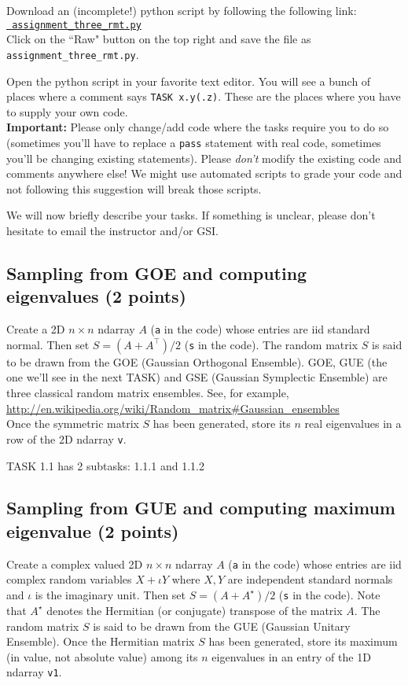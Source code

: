 \documentclass{article}
\begin{document}
Download an (incomplete!) python script by following the following
link:\\
\href{https://github.com/ambujtewari/stats607a-fall2017/blob/master/homeworks/assignment_three_rmt.py}{\tt
assignment\_three\_rmt.py} \\
Click on the ``Raw" button on the top right and save the file as {\tt
assignment\_three\_rmt.py}.

Open the python script in your favorite text editor. You will see a bunch of places where a comment says {\tt TASK x.y(.z)}. These are the places where you have to supply your
own code.\\
{\bf Important:} Please only change/add code where the tasks require you to do so (sometimes you'll have to replace a {\tt pass} statement with real code, sometimes you'll be changing existing statements). Please {\em don't} modify the existing code and comments anywhere else! We might use automated scripts to grade your code and not following this suggestion will break those scripts.

We will now briefly describe your tasks. If something is unclear, please don't hesitate to email the instructor and/or GSI.

\subsection{Sampling from GOE and computing eigenvalues (2 points)}

Create a 2D $n \times n$ ndarray $A$ (\verb#a# in the code) whose entries are iid standard normal. Then set $S = (A+A^\top)/2$ (\verb#s# in the code). The random matrix $S$ is said to be drawn from the GOE (Gaussian Orthogonal
Ensemble). GOE, GUE (the one we'll see in the next TASK) and GSE (Gaussian Symplectic Ensemble) are three classical random matrix ensembles. See, for example, \\
\url{http://en.wikipedia.org/wiki/Random_matrix#Gaussian_ensembles}\\
Once the symmetric matrix $S$ has been generated, store its $n$ real eigenvalues in a row of the 2D ndarray \verb#v#.

TASK 1.1 has 2 subtasks: 1.1.1 and 1.1.2

\subsection{Sampling from GUE and computing maximum eigenvalue (2 points)}

Create a complex valued 2D $n \times n$ ndarray $A$ (\verb#a# in the code) whose entries are iid complex random variables $X+ \iota Y$ where $X, Y$ are independent standard normals and $\iota$ is the imaginary unit. Then set $S = (A+A^\star)/2$ (\verb#s# in the code). Note that $A^\star$ denotes the Hermitian (or conjugate) transpose of the matrix $A$. The random matrix $S$ is said to be drawn from the GUE (Gaussian Unitary
Ensemble).
Once the Hermitian matrix $S$ has been generated, store its maximum (in value, not absolute value) among its $n$ eigenvalues in an entry of the 1D ndarray \verb#v1#.
\end{document}
